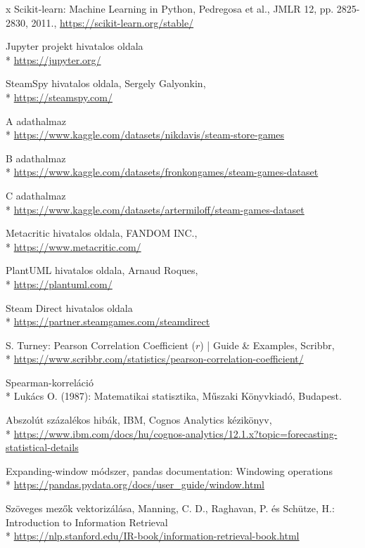 \begin{thebibliography}{x}
 Scikit-learn: Machine Learning in Python, Pedregosa et al., JMLR 12, pp. 2825-2830, 2011.,
\url{https://scikit-learn.org/stable/}

 Jupyter projekt hivatalos oldala\\*
\url{https://jupyter.org/}

 SteamSpy hivatalos oldala, Sergely Galyonkin,\\*
\url{https://steamspy.com/}

 A adathalmaz\\*
\url{https://www.kaggle.com/datasets/nikdavis/steam-store-games}

 B adathalmaz\\*
\url{https://www.kaggle.com/datasets/fronkongames/steam-games-dataset}

 C adathalmaz\\*
\url{https://www.kaggle.com/datasets/artermiloff/steam-games-dataset}

 Metacritic hivatalos oldala, FANDOM INC.,\\*
\url{https://www.metacritic.com/}

 PlantUML hivatalos oldala, Arnaud Roques,\\*
\url{https://plantuml.com/}

 Steam Direct hivatalos oldala\\*
\url{https://partner.steamgames.com/steamdirect}

S. Turney: Pearson Correlation Coefficient ($r$) | Guide \& Examples, Scribbr,\\*
\url{https://www.scribbr.com/statistics/pearson-correlation-coefficient/}

 Spearman-korreláció\\*
Lukács O. (1987): Matematikai statisztika, Műszaki Könyvkiadó, Budapest.

 Abszolút százalékos hibák, IBM, Cognos Analytics kézikönyv,\\*
\url{https://www.ibm.com/docs/hu/cognos-analytics/12.1.x?topic=forecasting-statistical-details}

 Expanding-window módszer, pandas documentation: Windowing operations\\*
\url{https://pandas.pydata.org/docs/user_guide/window.html}

 Szöveges mezők vektorizálása, Manning, C. D., Raghavan, P. és Sch\"utze, H.: Introduction to Information Retrieval\\*
\url{https://nlp.stanford.edu/IR-book/information-retrieval-book.html}


\end{thebibliography}
